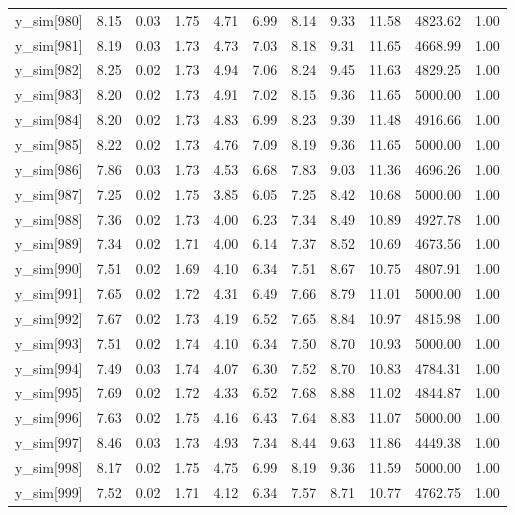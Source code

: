 \begin{table}[ht]
\begin{tabular}{rrrrrrrrrrr}
  y\_sim[980] & 8.15 & 0.03 & 1.75 & 4.71 & 6.99 & 8.14 & 9.33 & 11.58 & 4823.62 & 1.00 \\ 
  y\_sim[981] & 8.19 & 0.03 & 1.73 & 4.73 & 7.03 & 8.18 & 9.31 & 11.65 & 4668.99 & 1.00 \\ 
  y\_sim[982] & 8.25 & 0.02 & 1.73 & 4.94 & 7.06 & 8.24 & 9.45 & 11.63 & 4829.25 & 1.00 \\ 
  y\_sim[983] & 8.20 & 0.02 & 1.73 & 4.91 & 7.02 & 8.15 & 9.36 & 11.65 & 5000.00 & 1.00 \\ 
  y\_sim[984] & 8.20 & 0.02 & 1.73 & 4.83 & 6.99 & 8.23 & 9.39 & 11.48 & 4916.66 & 1.00 \\ 
  y\_sim[985] & 8.22 & 0.02 & 1.73 & 4.76 & 7.09 & 8.19 & 9.36 & 11.65 & 5000.00 & 1.00 \\ 
  y\_sim[986] & 7.86 & 0.03 & 1.73 & 4.53 & 6.68 & 7.83 & 9.03 & 11.36 & 4696.26 & 1.00 \\ 
  y\_sim[987] & 7.25 & 0.02 & 1.75 & 3.85 & 6.05 & 7.25 & 8.42 & 10.68 & 5000.00 & 1.00 \\ 
  y\_sim[988] & 7.36 & 0.02 & 1.73 & 4.00 & 6.23 & 7.34 & 8.49 & 10.89 & 4927.78 & 1.00 \\ 
  y\_sim[989] & 7.34 & 0.02 & 1.71 & 4.00 & 6.14 & 7.37 & 8.52 & 10.69 & 4673.56 & 1.00 \\ 
  y\_sim[990] & 7.51 & 0.02 & 1.69 & 4.10 & 6.34 & 7.51 & 8.67 & 10.75 & 4807.91 & 1.00 \\ 
  y\_sim[991] & 7.65 & 0.02 & 1.72 & 4.31 & 6.49 & 7.66 & 8.79 & 11.01 & 5000.00 & 1.00 \\ 
  y\_sim[992] & 7.67 & 0.02 & 1.73 & 4.19 & 6.52 & 7.65 & 8.84 & 10.97 & 4815.98 & 1.00 \\ 
  y\_sim[993] & 7.51 & 0.02 & 1.74 & 4.10 & 6.34 & 7.50 & 8.70 & 10.93 & 5000.00 & 1.00 \\ 
  y\_sim[994] & 7.49 & 0.03 & 1.74 & 4.07 & 6.30 & 7.52 & 8.70 & 10.83 & 4784.31 & 1.00 \\ 
  y\_sim[995] & 7.69 & 0.02 & 1.72 & 4.33 & 6.52 & 7.68 & 8.88 & 11.02 & 4844.87 & 1.00 \\ 
  y\_sim[996] & 7.63 & 0.02 & 1.75 & 4.16 & 6.43 & 7.64 & 8.83 & 11.07 & 5000.00 & 1.00 \\ 
  y\_sim[997] & 8.46 & 0.03 & 1.73 & 4.93 & 7.34 & 8.44 & 9.63 & 11.86 & 4449.38 & 1.00 \\ 
  y\_sim[998] & 8.17 & 0.02 & 1.75 & 4.75 & 6.99 & 8.19 & 9.36 & 11.59 & 5000.00 & 1.00 \\ 
  y\_sim[999] & 7.52 & 0.02 & 1.71 & 4.12 & 6.34 & 7.57 & 8.71 & 10.77 & 4762.75 & 1.00 \\ 

\end{tabular}
\end{table}
